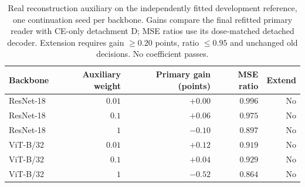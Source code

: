 \begin{table}[htbp]
\centering\small
\caption{Real reconstruction auxiliary on the independently fitted development
reference, one continuation seed per backbone. Gains compare the final refitted
primary reader with CE-only detachment D; MSE ratios use its dose-matched
detached decoder. Extension requires gain $\ge0.20$ points, ratio $\le0.95$ and
unchanged old decisions. No coefficient passes.}
\label{tab:vision_auxiliary_pilot}
\begin{tabular}{lrrrr}\toprule
Backbone & Auxiliary weight & Primary gain (points) & MSE ratio & Extend \\
\midrule
ResNet-18 & $0.01$ & $+0.00$ & $0.996$ & No \\
ResNet-18 & $0.1$ & $+0.06$ & $0.975$ & No \\
ResNet-18 & $1$ & $-0.10$ & $0.897$ & No \\
ViT-B/32 & $0.01$ & $+0.12$ & $0.919$ & No \\
ViT-B/32 & $0.1$ & $+0.04$ & $0.929$ & No \\
ViT-B/32 & $1$ & $-0.52$ & $0.864$ & No \\
\bottomrule\end{tabular}
\end{table}
